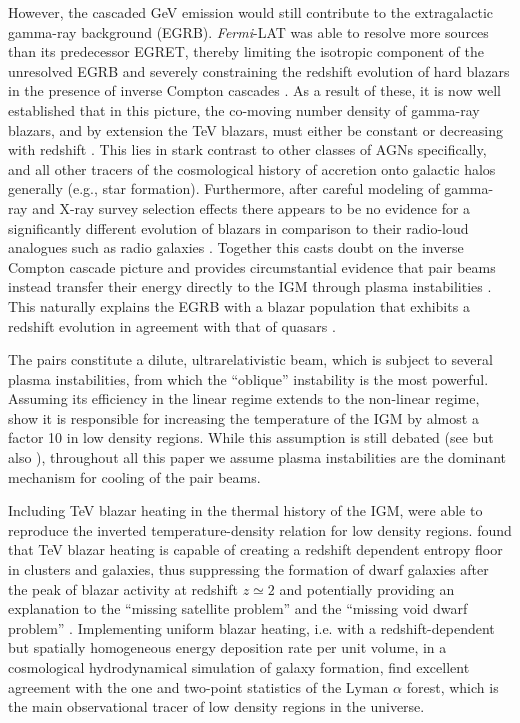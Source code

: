 \documentclass[numberedappendix]{emulateapj}
\begin{document}
However, the cascaded GeV emission would still contribute to the extragalactic gamma-ray background (EGRB). \textit{Fermi}-LAT was able to resolve more sources than its predecessor EGRET, thereby limiting the isotropic component of the unresolved EGRB and severely constraining the redshift evolution of hard blazars in the presence of inverse Compton cascades \citep[e.g.,][]{Vent:10,Murase:2012,Inoue:2012}. As a result of these, it is now well established that in this picture, the co-moving number density of gamma-ray blazars, and by extension the TeV blazars, must either be constant or decreasing with redshift \citep{Knei-Mann:08,Vent:10,Abazajian:2011,Inoue:2012}.  This lies in stark contrast to other classes of AGNs specifically, and all other tracers of the cosmological history of accretion onto galactic halos generally (e.g., star formation).  Furthermore, after careful modeling of gamma-ray and X-ray survey selection effects there appears to be no evidence for a significantly different evolution of blazars in comparison to their radio-loud analogues such as radio galaxies \citep{Giommi:2012,Giommi:2013}. Together this casts doubt on the inverse Compton cascade picture and provides circumstantial evidence that pair beams instead transfer their energy directly to the IGM through plasma instabilities \citep{2012ApJ...752...22B, 2012ApJ...758..102S, 2013ApJ...777...49S,2014ApJ...797..110C}. This naturally explains the EGRB with a blazar population that exhibits a redshift evolution in agreement with that of quasars \citep{2014ApJ...790..137B,2014ApJ...796...12B}.

The pairs constitute a dilute, ultrarelativistic beam, which is subject to several plasma instabilities, from which the ``oblique'' instability \citep{PhysRevE.70.046401} is the most powerful. Assuming its efficiency in the linear regime extends to the non-linear regime, \citet{2012ApJ...752...23C} show it is responsible for increasing the temperature of the IGM by almost a factor 10 in low density regions. While this assumption is still debated (see \citet{2013ApJ...770...54M,2014ApJ...787...49S} but also \citet{2013ApJ...777...49S,2012ApJ...758..102S,2014ApJ...797..110C}), throughout all this paper we assume plasma instabilities are the dominant mechanism for cooling of the pair beams.

Including TeV blazar heating in the thermal history of the IGM, \citet{2012ApJ...752...23C} were able to reproduce the inverted temperature-density relation for low density regions. \citet{2012ApJ...752...24P} found that TeV blazar heating  is capable of creating a redshift dependent entropy floor in clusters and galaxies, thus suppressing the formation of dwarf galaxies after the peak of blazar activity at redshift $z\simeq2$ and potentially providing an explanation to the ``missing satellite problem'' and the ``missing void dwarf problem'' \citep{2010AdAst2010E...8K}. Implementing uniform blazar heating, i.e. with a redshift-dependent but spatially homogeneous energy deposition rate per unit volume, in a cosmological hydrodynamical simulation of galaxy formation, \citet{2012MNRAS.423..149P} find excellent agreement with the one and two-point statistics of the Lyman $\alpha$ forest, which is the main observational tracer of low density regions in the universe.
\end{document}
